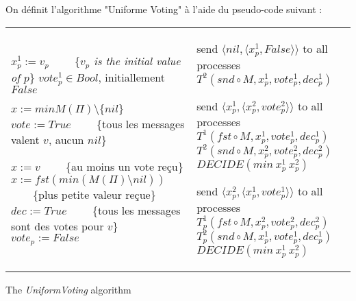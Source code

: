 \documentclass{article}
\begin{document}
On définit l'algorithme "Uniforme Voting" à l'aide du pseudo-code suivant :
\begin{algorithm}[htb]
\scriptsize{
\begin{distribalgo}[1]
\begin{tabular}{ll}
\begin{minipage}{41em}


\INDENT{\textbf{Initialization:}}
	\STATE $x^1_p := v_p$ ~~~~\{\emph{$v_p$ is the initial value of $p$}\}
	\STATE $vote^1_p \in Bool$, initiallement $False$
\ENDINDENT
\BLANK

\INDENT{\textbf{Fonctions sur une instance}}
	\INDENT{$T^1_p(M, ref ~ x, ref ~ vote, ref ~ dec):$}
		\STATE $ x := min M(\Pi) \setminus \{nil\}$ 
		\IF{$M(\Pi) = \{v\}$} 
			\STATE $vote := True$ ~~~~\{tous les messages valent $v$, aucun $nil$\}
		\ENDIF
	\ENDINDENT
	\BLANK

	\INDENT{$T^2_p(M, ref ~ x, ref ~ vote, ref ~ dec):$}

		\IF{$\exists v \in V, q \in \Pi, M(q) = \langle v, True \rangle$}
			\STATE $x := v$ ~~~~\{au moins un vote reçu\}
		\ELSE
			\STATE $x := fst (min (M(\Pi) \setminus {nil}))$ ~~~~\{plus petite valeur reçue\}
		\ENDIF
		\IF{$M(\Pi) = \{\langle v, True \rangle\}$}
			\STATE $dec := True$ ~~~~\{tous les messages sont des votes pour $v$\}
		\ENDIF
		\STATE $vote_p := False$
	\ENDINDENT
\ENDINDENT

\end{minipage}
&
\begin{minipage}{31em}

\INDENT{\textbf{Round $r=0$:}}
	\INDENT{$S_p:$}
		\STATE send $\langle nil, \langle  x^1_p , False \rangle \rangle$ to all processes
	\ENDINDENT
	\INDENT{$T_p(M):$}
		\STATE $T^2(snd \circ M, x^1_p, vote^1_p, dec^1_p)$
	\ENDINDENT
\ENDINDENT

\INDENT{\textbf{Round $r=2\phi+1$:}}
	\INDENT{$S_p:$}
		\STATE send $\langle x^1_p , \langle  x^2_p  , vote^2_p  \rangle  \rangle$ to all processes
	\ENDINDENT
	\BLANK
	\INDENT{$T_p(M):$}
		\STATE $T^1(fst \circ M, x^1_p, vote^1_p, dec^1_p)$
		\STATE $T^2(snd \circ M, x^2_p, vote^2_p, dec^2_p)$
		\IF{$dec^1_p \wedge dec^2_p $}
			\STATE $DECIDE(min ~ x^1_p ~ x^2_p)$
		\ENDIF
	\ENDINDENT
\ENDINDENT

\INDENT{\textbf{Round $r=2\phi+2$:}}
	\INDENT{$S_p:$}
		\STATE send $\langle x^2_p , \langle x^1_p, vote^1_p \rangle \rangle$ to all processes
	\ENDINDENT
	\BLANK
	\INDENT{$T_p(M)$}
		\STATE $T^1_p(fst \circ M, x_p^2, vote^2_p, dec^2_p)$
		\STATE $T^2_p(snd \circ M, x_p^1, vote^1_p, dec^1_p)$
		\IF{$dec^1_p \wedge dec^2_p $}
			\STATE $DECIDE(min ~ x^1_p ~ x^2_p)$
		\ENDIF
	\ENDINDENT
\ENDINDENT

\end{minipage}
\end{tabular}

\caption{The {\em UniformVoting} algorithm}
\label{unifvotfig}
\end{distribalgo}
}
\end{algorithm}
\end{document}
